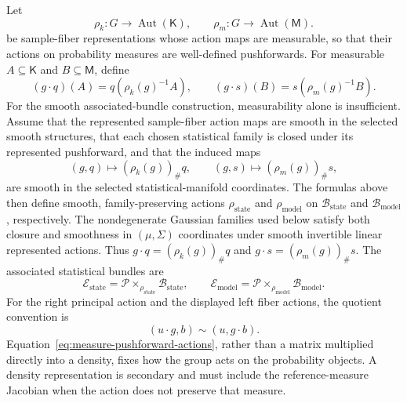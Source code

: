Let
\begin{equation}
\rho_k:G\longrightarrow\operatorname{Aut}(\mathsf K),
\qquad
\rho_m:G\longrightarrow\operatorname{Aut}(\mathsf M).
\label{eq:sample-representations}
\end{equation}
be sample-fiber representations whose action maps are measurable, so that their actions on probability measures are well-defined pushforwards. For measurable \(A\subseteq\mathsf K\) and \(B\subseteq\mathsf M\), define
\begin{equation}
(g\mathbin{\cdot}q)(A)=q\left(\rho_k(g)^{-1}A\right),
\qquad
(g\mathbin{\cdot}s)(B)=s\left(\rho_m(g)^{-1}B\right).
\label{eq:measure-pushforward-actions}
\end{equation}
For the smooth associated-bundle construction, measurability alone is insufficient. Assume that the represented sample-fiber action maps are smooth in the selected smooth structures, that each chosen statistical family is closed under its represented pushforward, and that the induced maps
\begin{equation}
(g,q)\longmapsto(\rho_k(g))_{\#}q,
\qquad
(g,s)\longmapsto(\rho_m(g))_{\#}s,
\label{eq:smooth-statistical-actions}
\end{equation}
are smooth in the selected statistical-manifold coordinates. The formulas above then define smooth, family-preserving actions \(\rho_{\mathrm{state}}\) and \(\rho_{\mathrm{model}}\) on \(\mathcal B_{\mathrm{state}}\) and \(\mathcal B_{\mathrm{model}}\), respectively. The nondegenerate Gaussian families used below satisfy both closure and smoothness in \((\mu,\Sigma)\) coordinates under smooth invertible linear represented actions. Thus \(g\mathbin{\cdot}q=(\rho_k(g))_{\#}q\) and \(g\mathbin{\cdot}s=(\rho_m(g))_{\#}s\). The associated statistical bundles are
\begin{equation}
\mathcal E_{\mathrm{state}}
=\mathcal P\times_{\rho_{\mathrm{state}}}\mathcal B_{\mathrm{state}},
\qquad
\mathcal E_{\mathrm{model}}
=\mathcal P\times_{\rho_{\mathrm{model}}}\mathcal B_{\mathrm{model}}.
\label{eq:associated-statistical-bundles}
\end{equation}
For the right principal action and the displayed left fiber actions, the quotient convention is
\begin{equation}
(u\mathbin{\cdot}g,b)\sim(u,g\mathbin{\cdot}b).
\label{eq:associated-bundle-quotient-convention}
\end{equation}
Equation~\eqref{eq:measure-pushforward-actions}, rather than a matrix multiplied directly into a density, fixes how the group acts on the probability objects. A density representation is secondary and must include the reference-measure Jacobian when the action does not preserve that measure.

